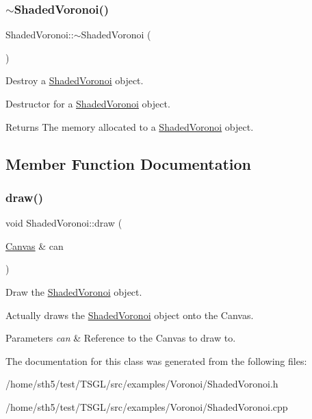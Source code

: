 \subsubsection{\texorpdfstring{$\sim$\+Shaded\+Voronoi()}{~ShadedVoronoi()}}
{\footnotesize\ttfamily Shaded\+Voronoi\+::$\sim$\+Shaded\+Voronoi (\begin{DoxyParamCaption}{ }\end{DoxyParamCaption})\hspace{0.3cm}{\ttfamily [virtual]}}



Destroy a \hyperlink{class_shaded_voronoi}{Shaded\+Voronoi} object. 

Destructor for a \hyperlink{class_shaded_voronoi}{Shaded\+Voronoi} object. \begin{DoxyReturn}{Returns}
The memory allocated to a \hyperlink{class_shaded_voronoi}{Shaded\+Voronoi} object. 
\end{DoxyReturn}


\subsection{Member Function Documentation}
\mbox{\label{class_shaded_voronoi_a5946cbfff9ea57f504cba8235ba814be}} 
\subsubsection{\texorpdfstring{draw()}{draw()}}
{\footnotesize\ttfamily void Shaded\+Voronoi\+::draw (\begin{DoxyParamCaption}\item[{\hyperlink{classtsgl_1_1_canvas}{Canvas} \&}]{can }\end{DoxyParamCaption})}



Draw the \hyperlink{class_shaded_voronoi}{Shaded\+Voronoi} object. 

Actually draws the \hyperlink{class_shaded_voronoi}{Shaded\+Voronoi} object onto the Canvas. 
\begin{DoxyParams}{Parameters}
{\em can} & Reference to the Canvas to draw to. \\
\hline
\end{DoxyParams}


The documentation for this class was generated from the following files\+:\begin{DoxyCompactItemize}
\item 
/home/sth5/test/\+T\+S\+G\+L/src/examples/\+Voronoi/Shaded\+Voronoi.\+h\item 
/home/sth5/test/\+T\+S\+G\+L/src/examples/\+Voronoi/Shaded\+Voronoi.\+cpp\end{DoxyCompactItemize}
